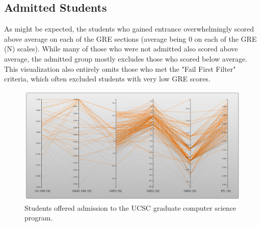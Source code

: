 \documentclass[]{article}
\begin{document}
	\subsection {Admitted Students}
		As might be expected, the students who gained entrance overwhelmingly scored above average on each of the GRE sections (average being 0 on each of the GRE (N) scales). While many of those who were not admitted also scored above average, the admitted group mostly excludes those who scored below average. This visualization also entirely omits those who met the "Fail First Filter" criteria, which often excluded students with very low GRE scores.
	
		\begin{figure}[h]
			\includegraphics[width=\linewidth]{admitted.png}
			\caption{Students offered admission to the UCSC graduate computer science program.}
			\label{fig:Admitted}
		\end{figure}
		
\end{document}
